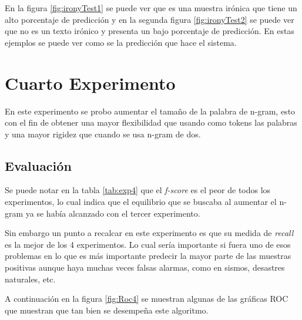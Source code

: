 	   \par En la figura \ref{fig:ironyTest1} se puede ver que es una muestra irónica que tiene un alto porcentaje de predicción y en la segunda figura \ref{fig:ironyTest2} se puede ver que no es un texto irónico y presenta un bajo porcentaje de predicción. En estas ejemplos se puede ver como se la predicción que hace el sistema.
		 
    \section{Cuarto Experimento}
    
    \par En este experimento se probo aumentar el tamaño de la palabra de n-gram, esto con el fin de obtener una mayor flexibilidad que usando como tokens las palabras y una mayor rigidez que cuando se usa n-gram de dos. 
    
    \subsection{Evaluación}
    
    \begin{center}
	  
	\end{center}
	
	\par Se puede notar en la tabla \ref{tab:exp4} que el \textit{f-score} es el peor de todos los experimentos, lo cual indica que el equilibrio que se buscaba al aumentar el n-gram ya se había alcanzado con el tercer experimento.
	
	\par Sin embargo un punto a recalcar en este experimento es que su medida de \textit{recall} es la mejor de los 4 experimentos. Lo cual sería importante si fuera uno de esos problemas en lo que es más importante predecir la mayor parte de las muestras positivas aunque haya muchas veces falsas alarmas, como en sismos, desastres naturales, etc.
	
		 \par A continuación en la figura \ref{fig:Roc4}  se muestran algunas de las gráficas ROC que muestran que tan bien se desempeña este algoritmo.
		
